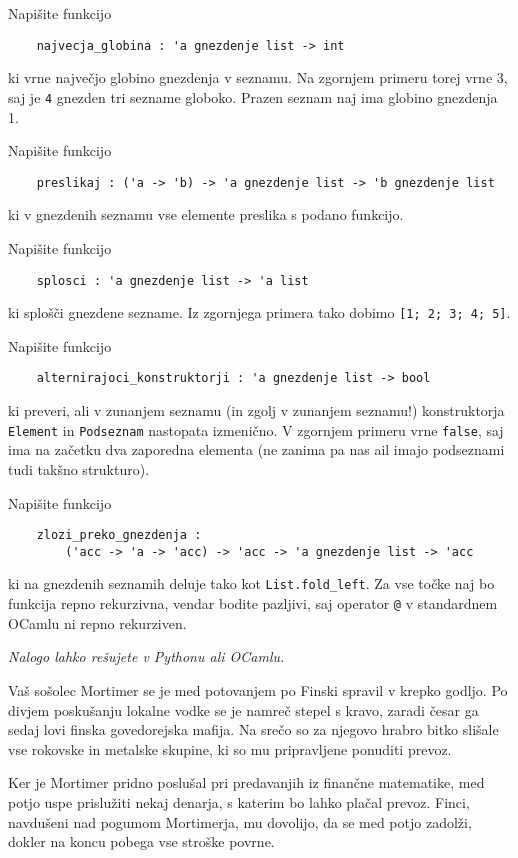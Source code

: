 \documentclass[arhiv]{../izpit}
\begin{document}
\podnaloga
Napišite funkcijo
\begin{verbatim}
    najvecja_globina : 'a gnezdenje list -> int
\end{verbatim}
ki vrne največjo globino gnezdenja v seznamu. Na zgornjem primeru torej vrne 3, saj je \verb|4| gnezden tri sezname globoko. Prazen seznam naj ima globino gnezdenja 1.

\podnaloga
Napišite funkcijo
\begin{verbatim}
    preslikaj : ('a -> 'b) -> 'a gnezdenje list -> 'b gnezdenje list
\end{verbatim}
ki v gnezdenih seznamu vse elemente preslika s podano funkcijo.

\podnaloga
Napišite funkcijo
\begin{verbatim}
    splosci : 'a gnezdenje list -> 'a list
\end{verbatim}
ki splošči gnezdene sezname. Iz zgornjega primera tako dobimo \verb|[1; 2; 3; 4; 5]|.

\podnaloga
Napišite funkcijo
\begin{verbatim}
    alternirajoci_konstruktorji : 'a gnezdenje list -> bool
\end{verbatim}
ki preveri, ali v zunanjem seznamu (in zgolj v zunanjem seznamu!) konstruktorja \verb|Element| in \verb|Podseznam| nastopata izmenično. V zgornjem primeru vrne \verb|false|, saj ima na začetku dva zaporedna elementa (ne zanima pa nas ail imajo podseznami tudi takšno strukturo).

\podnaloga
Napišite funkcijo
\begin{verbatim}
    zlozi_preko_gnezdenja :
        ('acc -> 'a -> 'acc) -> 'acc -> 'a gnezdenje list -> 'acc
\end{verbatim}
ki na gnezdenih seznamih deluje tako kot \verb|List.fold_left|. Za vse točke naj bo funkcija repno rekurzivna, vendar bodite pazljivi, saj operator \verb|@| v standardnem OCamlu ni repno rekurziven.

\prostor

\naloga[]
\emph{Nalogo lahko rešujete v Pythonu ali OCamlu.}

Vaš sošolec Mortimer se je med potovanjem po Finski spravil v krepko godljo. Po divjem poskušanju lokalne vodke se je namreč stepel s kravo, zaradi česar ga sedaj lovi finska govedorejska mafija. Na srečo so za njegovo hrabro bitko slišale vse rokovske in metalske skupine, ki so mu pripravljene ponuditi prevoz.

Ker je Mortimer pridno poslušal pri predavanjih iz finančne matematike, med potjo uspe prislužiti nekaj denarja, s katerim bo lahko plačal prevoz. Finci, navdušeni nad pogumom Mortimerja, mu dovolijo, da se med potjo zadolži, dokler na koncu pobega vse stroške povrne.
\end{document}
